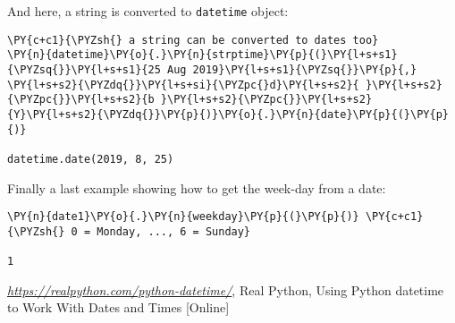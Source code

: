 And here, a string is converted to \texttt{datetime} object:

\begin{tcolorbox}[breakable, size=fbox, boxrule=1pt, pad at break*=1mm,colback=cellbackground, colframe=cellborder]
\begin{Verbatim}[commandchars=\\\{\}]
\PY{c+c1}{\PYZsh{} a string can be converted to dates too}
\PY{n}{datetime}\PY{o}{.}\PY{n}{strptime}\PY{p}{(}\PY{l+s+s1}{\PYZsq{}}\PY{l+s+s1}{25 Aug 2019}\PY{l+s+s1}{\PYZsq{}}\PY{p}{,} \PY{l+s+s2}{\PYZdq{}}\PY{l+s+si}{\PYZpc{}d}\PY{l+s+s2}{ }\PY{l+s+s2}{\PYZpc{}}\PY{l+s+s2}{b }\PY{l+s+s2}{\PYZpc{}}\PY{l+s+s2}{Y}\PY{l+s+s2}{\PYZdq{}}\PY{p}{)}\PY{o}{.}\PY{n}{date}\PY{p}{(}\PY{p}{)}

datetime.date(2019, 8, 25)
\end{Verbatim}
\end{tcolorbox}

Finally a last example showing how to get the week-day from a date:

\begin{tcolorbox}[breakable, size=fbox, boxrule=1pt, pad at break*=1mm,colback=cellbackground, colframe=cellborder]
\begin{Verbatim}[commandchars=\\\{\}]
\PY{n}{date1}\PY{o}{.}\PY{n}{weekday}\PY{p}{(}\PY{p}{)} \PY{c+c1}{\PYZsh{} 0 = Monday, ..., 6 = Sunday}

1
\end{Verbatim}
\end{tcolorbox}

\begin{thebibliography}{9}
	 \href{https://realpython.com/python-datetime/}{\emph{https://realpython.com/python-datetime/}}, Real Python, Using Python datetime to Work With Dates and Times [Online]
\end{thebibliography}
